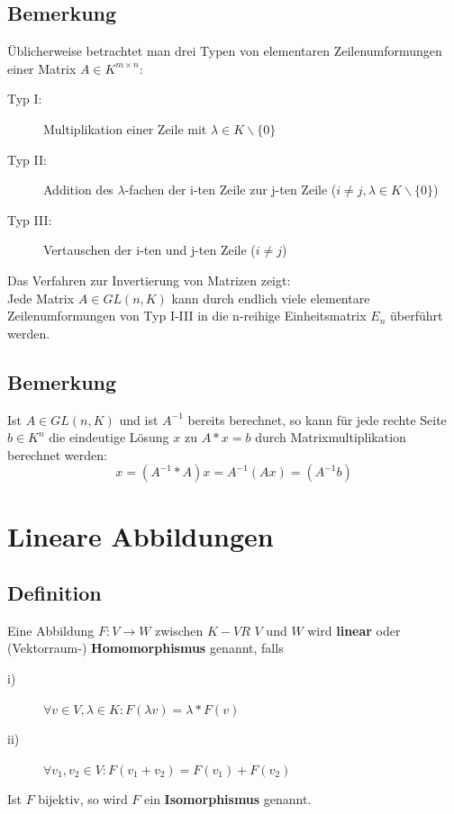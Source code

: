 \documentclass{scrbook}
\begin{document}
\section{Bemerkung}
Üblicherweise betrachtet man drei Typen von elementaren Zeilenumformungen einer Matrix $A \in K^{m\times n}$:
\begin{description}
\item[Typ I:] Multiplikation einer Zeile mit $\lambda \in K\backslash\{0\}$
\item[Typ II:] Addition des $\lambda$-fachen der i-ten Zeile zur j-ten Zeile ($i\neq j, \lambda\in K\backslash\{0\}$)
\item[Typ III:] Vertauschen der i-ten und j-ten Zeile ($i \neq j$)
\end{description}
Das Verfahren zur Invertierung von Matrizen zeigt:\\
Jede Matrix $A\in GL(n,K)$ kann durch endlich viele elementare Zeilenumformungen von Typ I-III in die n-reihige Einheitsmatrix $E_n$ überführt werden.
\section{Bemerkung}
Ist $A\in GL(n,K)$ und ist $A^{-1}$ bereits berechnet, so kann für jede rechte Seite $b\in K^n$ die eindeutige Lösung $x$ zu $A*x=b$ durch Matrixmultiplikation berechnet werden:
\[x=(A^{-1}*A)x=A^{-1}(Ax)=(A^{-1}b)\]
\chapter{Lineare Abbildungen}
\section{Definition}
Eine Abbildung $F:V \rightarrow W$ zwischen $K-VR$ $V$ und $W$ wird \textbf{linear} oder (Vektorraum-) \textbf{Homomorphismus} genannt, falls \begin{description}
\item[i)] $\forall v\in V, \lambda \in K: F(\lambda v) = \lambda *F(v)$
\item[ii)] $\forall v_1,v_2 \in V: F(v_1+v_2)=F(v_1)+F(v_2)$
\end{description}
Ist $F$ bijektiv, so wird $F$ ein \textbf{Isomorphismus} genannt.
\end{document}
